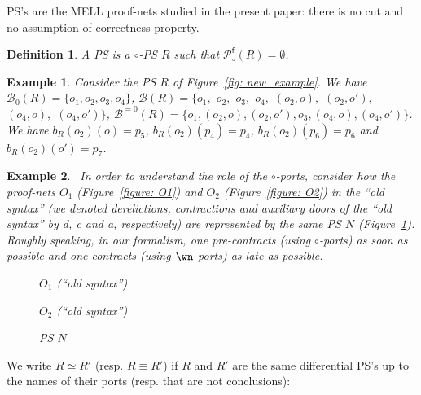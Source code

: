 \documentclass{article}
\theoremstyle{plain}
\newtheorem{definition}{Definition}
\newtheorem{example}{Example}
\newcommand{\contr}{\wn}
\newcommand{\conclusionscirc}[1]{\mathcal{P}_\circ^{\textsf{f}}(#1)}
\newcommand{\boxes}[1]{\mathcal{B}(#1)}
\newcommand{\boxesatzero}[1]{\mathcal{B}_{0}(#1)}
\newcommand{\exactboxes}[2]{\mathcal{B}^{=#2}(#1)}
\newcommand{\scalefactter}{0.33}
\newcommand{\pictter}[1]{\scalebox{\scalefactter}{}}
\begin{document}
PS's are the MELL proof-nets studied in the present paper: there is no cut and no assumption of correctness property.

\begin{definition}\label{defin: PS}
A PS is a $\circ$-PS $R$ such that $\conclusionscirc{R} = \emptyset$.
\end{definition}

\begin{example}
Consider the PS $R$ of Figure~\ref{fig: new_example}. 
We have $\boxesatzero{R} = \{ o_1, o_2, o_3, o_4 \}$, $\boxes{R} = \{ o_1,$ $o_2,$ $o_3,$ $o_4,$ $(o_2, o),$ $(o_2, o'),$ $(o_4, o),$ $(o_4, o') \}$, $\exactboxes{R}{0} = \{ o_1, (o_2, o), (o_2, o'), o_3, (o_4, o), (o_4, o') \}$. We have $b_{R}(o_2)(o) = p_5$, $b_R(o_2)(p_4) = p_4$, $b_R(o_2)(p_6) = p_6$ and $b_R(o_2)(o') = p_7$.
\end{example}

\begin{example}~\label{example: old versus new}
In order to understand the role of the $\circ$-ports, consider how the proof-nets $O_1$ (Figure~\ref{figure: O1}) and $O_2$ (Figure~\ref{figure: O2}) in the ``old syntax'' (we denoted derelictions, contractions and auxiliary doors of the ``old syntax'' by \textsf{d}, \textsf{c} and \textsf{a}, respectively) are represented by the same PS $N$ (Figure~\ref{figure: N}). Roughly speaking, in our formalism, one pre-contracts (using $\circ$-ports) as soon as possible and one contracts (using $\contr$-ports) as late as possible.

\begin{figure}
\centering
\begin{minipage}{4.5cm}
\centering
\pictter{O1}
\caption{$O_1$ (``old syntax'')}
\label{figure: O1}
\end{minipage}\hfill
\begin{minipage}{4.5cm}
\centering
\pictter{O2}
\caption{$O_2$ (``old syntax'')}
\label{figure: O2}
\end{minipage}
\begin{minipage}{4.5cm}
\centering
\pictter{N}
\caption{PS $N$}
\label{figure: N}
\end{minipage}
\end{figure}
\end{example}



We write $R \simeq R'$ (resp. $R \equiv R'$) if $R$ and $R'$ are the same differential PS's up to the names of their ports (resp. that are not conclusions):
\end{document}
